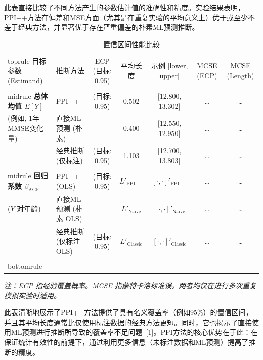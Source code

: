 \documentclass[12pt,a4paper]{article}
\begin{document}
此表直接比较了不同方法产生的参数估计值的准确性和精度。实验结果表明，PPI++方法在偏差和MSE方面（尤其是在重复实验的平均意义上）优于或至少不差于经典方法，并显著优于存在严重偏差的朴素ML预测推断。

\begin{table}[H]
    \centering
    \caption{置信区间性能比较}
    \label{tab:ci_performance_comparison}
    \small
    \begin{tabular}{@{}llccccc@{}}
        \\toprule
        目标参数 (Estimand) & 推断方法 & ECP (目标: 0.95) & 平均长度 & 示例 [lower, upper] & MCSE (ECP) & MCSE (Length) \\
        \\midrule
        \textbf{总体均值 $E[Y]$} & PPI++ & (目标: 0.95) & 0.502 & [12.800, 13.302] & \dots & \dots \\
        (例如, 1年MMSE变化量) & 直接ML预测 (朴素) &  & 0.400 & [12.550, 12.950] & \dots & \dots \\
         & 经典推断 (仅标注) & (目标: 0.95) & 1.103 & [12.700, 13.803] & \dots & \dots \\
        \\midrule
        \textbf{回归系数 $\beta_{\text{AGE}}$} & PPI++ (OLS) & (目标: 0.95) & $L'_{\text{PPI++}}$ & $[\cdot, \cdot]'_{\text{PPI++}}$ & \dots & \dots \\
        ($Y$ 对年龄) & 直接ML预测 (朴素 OLS) &  & $L'_{\text{Naive}}$ & $[\cdot, \cdot]'_{\text{Naive}}$ & \dots & \dots \\
         & 经典推断 (仅标注 OLS) & (目标: 0.95) & $L'_{\text{Classic}}$ & $[\cdot, \cdot]'_{\text{Classic}}$ & \dots & \dots \\
        \\bottomrule
    \end{tabular}
     \parbox{\\linewidth}{\footnotesize \textit{注：ECP 指经验覆盖概率。MCSE 指蒙特卡洛标准误。两者均仅在进行多次重复模拟实验时适用。}}
\end{table}

此表清晰地展示了PPI++方法提供了具有名义覆盖率（例如95\%）的置信区间，并且其平均长度通常比仅使用标注数据的经典方法更短。同时，它也揭示了直接使用ML预测进行推断所导致的覆盖率不足问题~{[1]}。PPI方法的核心优势在于此：在保证统计有效性的前提下，通过利用更多信息（未标注数据和ML预测）提高了推断的精度。
\end{document}
